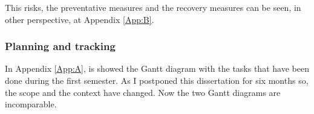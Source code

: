 This risks, the preventative measures and the recovery measures can be seen, in other perspective, at Appendix \ref{App:B}.

\subsubsection{Planning and tracking}

In Appendix \ref{App:A}, is showed the Gantt diagram with the tasks that have been done during the first semester.
As I postponed this dissertation for six months so, the scope and the context have changed. Now the two Gantt diagrams are incomparable.



